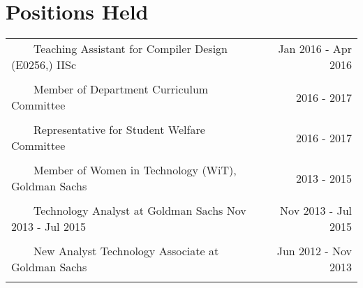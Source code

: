 \documentclass[a4paper,10pt]{article} %
\newcommand{\tabitem}{~~\llap{\textbullet}~~}
\begin{document}
\section{Positions Held}

\begin{tabular}{p{12cm}r}
\tabitem Teaching Assistant for Compiler Design (E0256,) IISc  & Jan 2016 - Apr 2016 \\
&\\
\tabitem Member of Department Curriculum Committee &  2016 - 2017\\
&\\
\tabitem Representative for Student Welfare Committee  & 2016 - 2017\\
&\\
\tabitem Member of Women in Technology (WiT), Goldman Sachs  & 2013 - 2015\\
&\\
\tabitem Technology Analyst at Goldman Sachs Nov 2013 - Jul 2015 & Nov 2013 - Jul 2015 \\
&\\
\tabitem New Analyst Technology Associate at Goldman Sachs & Jun 2012 - Nov 2013 \\
&\\
\end{tabular}

\end{document}
